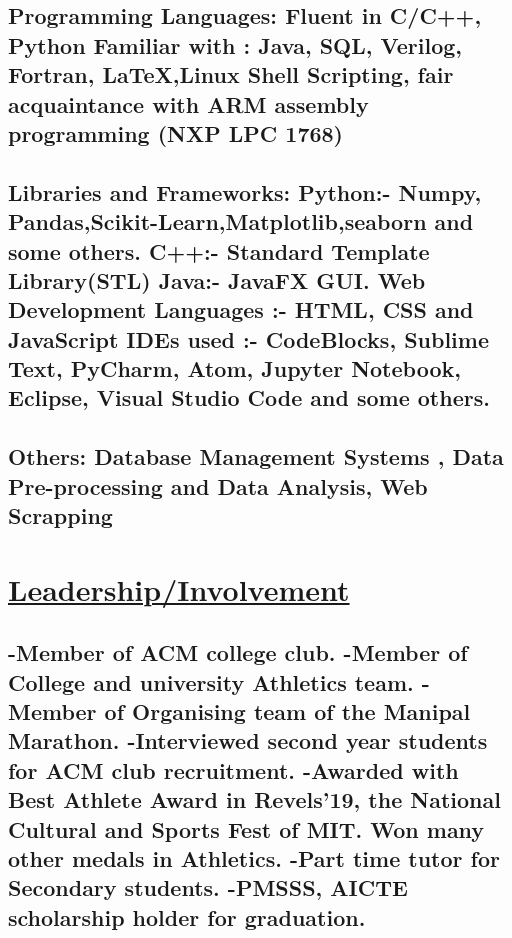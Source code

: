 \documentclass{article}
\begin{document}
\subsection{\textbf{Programming Languages:}
    \textmd{Fluent in C/C++, Python }\newline
    \textmd{Familiar with : Java, SQL, Verilog, Fortran, {\LaTeX},Linux Shell Scripting, fair acquaintance
        with ARM assembly programming (NXP LPC 1768) } }

\subsection{\textbf{Libraries and Frameworks:}\newline
    \textbf{Python:}\textmd{- Numpy, Pandas,Scikit-Learn,Matplotlib,seaborn and some others.}\newline
    \textbf{C++:}\textmd{- Standard Template Library(STL)}\newline
    \textbf{Java:}\textmd{- JavaFX GUI.}\newline
    \textbf{Web Development Languages :}\textmd{- HTML, CSS and JavaScript}\newline
    \textbf{IDEs used :}\textmd{- CodeBlocks, Sublime Text, PyCharm, Atom, Jupyter Notebook, Eclipse, Visual Studio Code and some others.}}

\subsection{\textbf{Others:}
    \textmd{Database Management Systems , Data Pre-processing and Data Analysis, Web Scrapping}}




\section{\underline{Leadership/Involvement}}
\subsection{\textmd{-Member of ACM college club. }\newline
    \textmd{-Member of College and university Athletics team. }\newline
    \textmd{-Member of Organising team of the Manipal Marathon. }\newline
    \textmd{-Interviewed second year students for ACM club recruitment. }\newline
    \textmd{-Awarded with Best Athlete Award in Revels'19, the National Cultural and Sports Fest of MIT. Won many other medals in Athletics. }\newline
    \textmd{-Part time tutor for Secondary students. }\newline
    \textmd{-PMSSS, AICTE scholarship holder for graduation.}}



\end{document}
